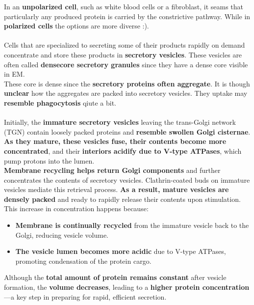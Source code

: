 \documentclass[../main.tex]{subfiles}
\begin{document}
\indent In an \textbf{unpolarized cell}, such as white blood cells or a fibroblast, it seams that particularly any produced protein is carried by the constrictive pathway. While in \textbf{polarized cells} the options are more diverse :). \\
\\
Cells that are specialized to secreting some of their products rapidly on demand concentrate and store these products in \textbf{secretory vesicles}. These vesicles are often called \textbf{densecore secretory granules} since they have a dense core visible in EM. \\
\indent These core is dense since the \textbf{secretory proteins often aggregate}. It is though \textbf{unclear} how the aggregates are packed into secretory vesicles. They uptake may \textbf{resemble phagocytosis} qiute a bit. \\
\\
Initially, the \textbf{immature secretory vesicles} leaving the trans-Golgi network (TGN) contain loosely packed proteins and \textbf{resemble swollen Golgi cisternae}. \textbf{As they mature, these vesicles fuse, their contents become more concentrated}, and their \textbf{interiors acidify due to V-type ATPases}, which pump protons into the lumen.
\\
\indent\textbf{Membrane recycling helps return Golgi components} and further concentrates the contents of secretory vesicles. Clathrin-coated buds on immature vesicles mediate this retrieval process. \textbf{As a result, mature vesicles are densely packed} and ready to rapidly release their contents upon stimulation.\\
\indent This increase in concentration happens because:
\begin{itemize}
	\item \textbf{Membrane is continually recycled} from the immature vesicle back to the Golgi, reducing vesicle volume.
	\item \textbf{The vesicle lumen becomes more acidic} due to V-type ATPases, promoting condensation of the protein cargo.
\end{itemize}
Although the \textbf{total amount of protein remains constant} after vesicle formation, the \textbf{volume decreases}, leading to a \textbf{higher protein concentration}—a key step in preparing for rapid, efficient secretion.
\end{document}
